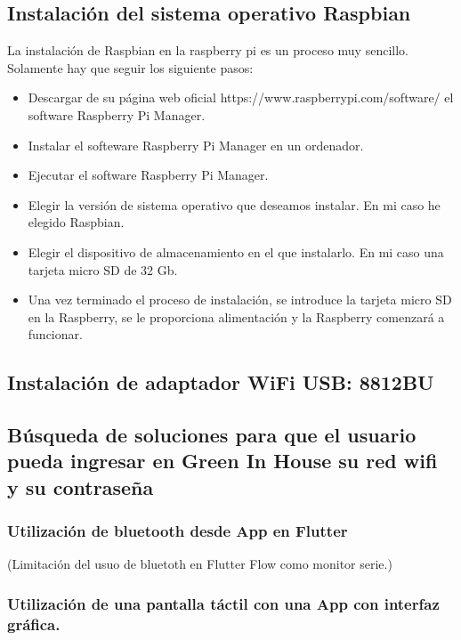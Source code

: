     \subsection{Instalación del sistema operativo Raspbian}
    La instalación de Raspbian en la raspberry pi es un proceso muy sencillo. Solamente hay que seguir los siguiente pasos:    
    \begin{itemize}
        \item Descargar de su página web oficial https://www.raspberrypi.com/software/ el software Raspberry Pi Manager.
        \item Instalar el softeware Raspberry Pi Manager en un ordenador.
        \item Ejecutar el software Raspberry Pi Manager.
        \item Elegir la versión de sistema operativo que deseamos instalar. En mi caso he elegido Raspbian.
        \item Elegir el dispositivo de almacenamiento en el que instalarlo. En mi caso una tarjeta micro SD de 32 Gb.
        \item Una vez terminado el proceso de instalación, se introduce la tarjeta micro SD en la Raspberry, se le proporciona alimentación y la Raspberry comenzará a funcionar.      
    \end{itemize}

    \subsection{Instalación de adaptador WiFi USB: 8812BU}  
    

    
    \subsection{Búsqueda de soluciones para que el usuario pueda ingresar en Green In House su red wifi y su contraseña}
    
        \subsubsection{Utilización de bluetooth desde App en Flutter}
        (Limitación del usuo de bluetoth en Flutter Flow como monitor serie.)
        
        \subsubsection{Utilización de una pantalla táctil con una App con interfaz gráfica.}

